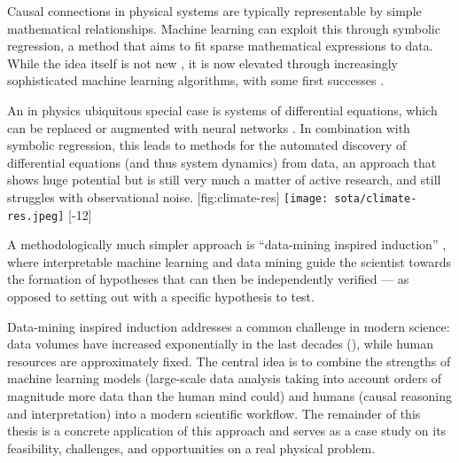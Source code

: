 Causal connections in physical systems are typically representable by simple mathematical relationships. Machine learning can exploit this through symbolic regression, a method that aims to fit sparse mathematical expressions to data. While the idea itself is not new \citep[traditionally based on genetic programming,][]{schmidt_distilling_2009}, it is now elevated through increasingly sophisticated machine learning algorithms, with some first successes \citep{udrescu_ai_2020,zanna_data-driven_2020,lemos_rediscovering_2022,cranmer_discovering_2020}.

An in physics ubiquitous special case is systems of differential equations, which can be replaced or augmented with neural networks \citep[neural ODEs / UDEs,][]{chen_neural_2019,rackauckas_universal_2021,kidger_neural_2022}. In combination with symbolic regression, this leads to methods for the automated discovery of differential equations (and thus system dynamics) from data, an approach that shows huge potential \citep{brunton_discovering_2016,long_pde-net_2019,champion_data-driven_2019,bakarji_discovering_2022,reinbold_robust_2021} but is still very much a matter of active research, and still struggles with observational noise.
%
[fig:climate-res]{
    \texttt{[image: sota/climate-res.jpeg]}
}[-12]

A methodologically much simpler approach is \enquote{data-mining inspired induction} \citep{voit_perspective_2019}, where interpretable machine learning \citep{molnar_interpretable_nodate} and data mining guide the scientist towards the formation of hypotheses that can then be independently verified --- as opposed to setting out with a specific hypothesis to test.

Data-mining inspired induction addresses a common challenge in modern science: data volumes have increased exponentially in the last decades (), while human resources are approximately fixed. The central idea is to combine the strengths of machine learning models (large-scale data analysis taking into account orders of magnitude more data than the human mind could) and humans (causal reasoning and interpretation) into a modern scientific workflow. The remainder of this thesis is a concrete application of this approach and serves as a case study on its feasibility, challenges, and opportunities on a real physical problem.
